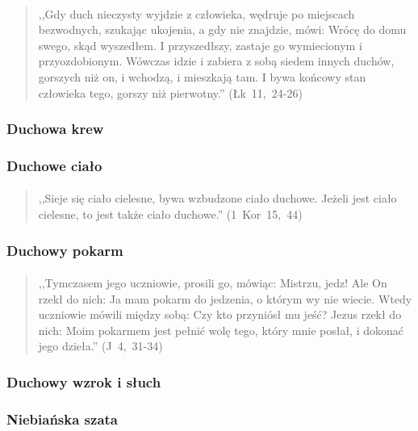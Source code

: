 \documentclass[10pt,a4paper,oneside]{article}
\begin{document}
\paragraph{}
\begin{quote}
,,Gdy duch nieczysty wyjdzie z człowieka, wędruje po miejscach bezwodnych, szukając ukojenia, a gdy nie znajdzie, mówi: Wrócę do domu swego, skąd wyszedłem. I przyszedłszy, zastaje go wymiecionym i przyozdobionym. Wówczas idzie i zabiera z sobą siedem innych duchów, gorszych niż on, i wchodzą, i mieszkają tam. I bywa końcowy stan człowieka tego, gorszy niż pierwotny.'' \mbox{(Łk 11, 24-26)}
\end{quote}
\subsubsection{Duchowa krew}
\subsubsection{Duchowe ciało}
\paragraph{}
\begin{quote}
,,Sieje się ciało cielesne, bywa wzbudzone ciało duchowe. Jeżeli jest ciało cielesne, to jest także ciało duchowe.'' \mbox{(1 Kor 15, 44)}
\end{quote}
\subsubsection{Duchowy pokarm}
\paragraph{}
\begin{quote}
,,Tymczasem jego uczniowie, prosili go, mówiąc: Mistrzu, jedz! Ale On rzekł do nich: Ja mam pokarm do jedzenia, o którym wy nie wiecie. Wtedy uczniowie mówili między sobą: Czy kto przyniósł mu jeść? Jezus rzekł do nich: Moim pokarmem jest pełnić wolę tego, który mnie posłał, i dokonać jego dzieła.'' \mbox{(J 4, 31-34)}
\end{quote}
\subsubsection{Duchowy wzrok i słuch}
\subsubsection{Niebiańska szata}
\end{document}
